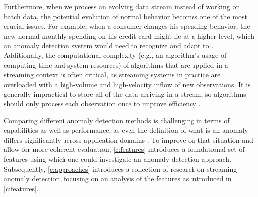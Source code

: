 Furthermore, when we process an evolving data stream instead of working on batch data, the potential evolution of normal behavior becomes one of the most crucial issues. For example, when a consumer changes his spending behavior, the new normal monthly spending on his credit card might lie at a higher level, which an anomaly detection system would need to recognize and adapt to \citep{bolton_statistical_2002}. Additionally, the computational complexity (e.g., an algorithm’s usage of computing time and system resources) of algorithms that are applied in a streaming context is often critical, as streaming systems in practice are overloaded with a high-volume and high-velocity inflow of new observations. It is generally impractical to store all of the data arriving in a stream, so algorithms should only process each observation once to improve efficiency \citep{schneider_expected_2016, hayes_contextual_2015}.

Comparing different anomaly detection methods is challenging in terms of capabilities as well as performance, as even the definition of what is an anomaly differs significantly across application domains \citep{hayes_contextual_2015}. To improve on that situation and allow for more coherent evaluation, \cref{c:features} introduces a foundational set of features using which one could investigate an anomaly detection approach. Subsequently, \cref{c:approaches} introduces a collection of research on streaming anomaly detection, focusing on an analysis of the features as introduced in \cref{c:features}.